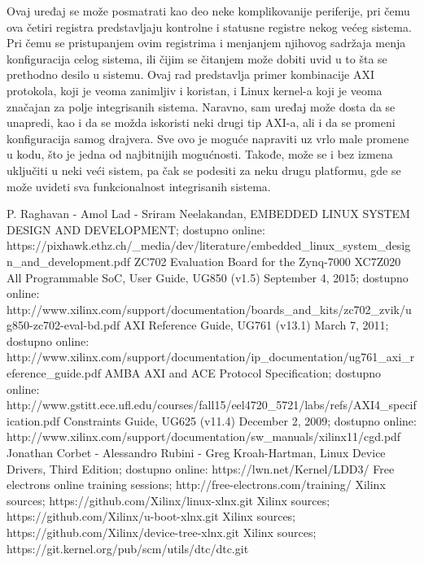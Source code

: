 \documentclass[a4paper, 12pt, diplomski]{etf}
\begin{document}
		Ovaj uređaj se može posmatrati kao deo neke komplikovanije periferije, pri čemu ova četiri registra predstavljaju kontrolne i statusne registre nekog većeg sistema. Pri čemu se pristupanjem ovim registrima i menjanjem njihovog sadržaja menja konfiguracija celog sistema, ili čijim se čitanjem može dobiti uvid u to šta se prethodno desilo u sistemu. Ovaj rad predstavlja primer kombinacije AXI protokola, koji je veoma zanimljiv i koristan, i Linux kernel-a koji je veoma značajan za polje integrisanih sistema. Naravno, sam uređaj može dosta da se unapredi, kao i da se možda iskoristi neki drugi tip AXI-a, ali i da se promeni konfiguracija samog drajvera. Sve ovo je moguće napraviti uz vrlo male promene u kodu, što je jedna od najbitnijih mogućnosti. Takođe, može se i bez izmena uključiti u neki veći sistem, pa čak se podesiti za neku drugu platformu, gde se može uvideti sva funkcionalnost integrisanih sistema.


	\newpage


	\begin{thebibliography}{10}

		 P. Raghavan - Amol Lad - Sriram Neelakandan, EMBEDDED LINUX SYSTEM DESIGN AND DEVELOPMENT; dostupno online: https://pixhawk.ethz.ch/\_media/dev/literature/embedded\_li\-nux\_system\_design\_and\_development.pdf
		 ZC702 Evaluation Board for the Zynq-7000 XC7Z020 All Programmable SoC, User Guide, UG850 (v1.5) September 4, 2015; dostupno online: http://www.xilinx.com/support/documentation/boards\_and\_kits/\-zc702\_zvik/ug850-zc702-eval-bd.pdf
		 AXI Reference Guide, UG761 (v13.1) March 7, 2011; dostupno online: http://www.xilinx.com/support/documentation/ip\_documentation/\-ug761\_axi\_reference\_guide.pdf
		AMBA AXI and ACE Protocol Specification; dostupno online: http://www.gstitt.ece.ufl.edu/courses/fall15/eel4720\_5721/labs/refs/\-AXI4\_specification.pdf
		 Constraints Guide, UG625 (v11.4) December 2, 2009; dostupno online: http://www.xilinx.com/support/documentation/sw\_manuals/xilinx11/\-cgd.pdf
		 Jonathan Corbet - Alessandro Rubini - Greg Kroah-Hartman, Linux Device Drivers, Third Edition; dostupno online: https://lwn.net/Kernel/LDD3/
		 Free electrons online training sessions; http://free-electrons.com/training/
		 Xilinx sources; https://github.com/Xilinx/linux-xlnx.git
		 Xilinx sources; https://github.com/Xilinx/u-boot-xlnx.git
		 Xilinx sources; https://github.com/Xilinx/device-tree-xlnx.git
		 Xilinx sources; https://git.kernel.org/pub/scm/utils/dtc/dtc.git

	\end{thebibliography}
\end{document}

